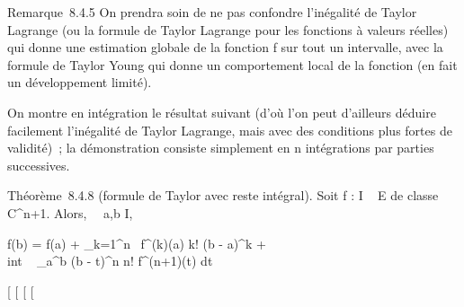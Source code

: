 \documentclass[]{article}
\begin{document}
Remarque~8.4.5 On prendra soin de ne pas confondre l'inégalité de Taylor
Lagrange (ou la formule de Taylor Lagrange pour les fonctions à valeurs
réelles) qui donne une estimation globale de la fonction f sur tout un
intervalle, avec la formule de Taylor Young qui donne un comportement
local de la fonction (en fait un développement limité).

On montre en intégration le résultat suivant (d'où l'on peut d'ailleurs
déduire facilement l'inégalité de Taylor Lagrange, mais avec des
conditions plus fortes de validité)~; la démonstration consiste
simplement en n intégrations par parties successives.

Théorème~8.4.8 (formule de Taylor avec reste intégral). Soit f : I \rightarrow~ E
de classe C^n+1. Alors, \forall~~a,b \in I,

f(b) = f(a) + \sum _k=1^n~
f^(k)(a) \over k! (b - a)^k +
\\int  ~
_a^b (b - t)^n \over n!
f^(n+1)(t) dt

{[}
{[}
{[}
{[}
\end{document}
